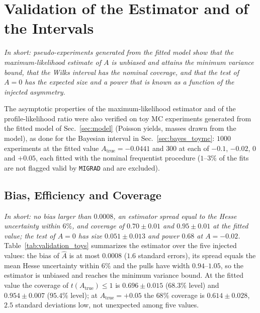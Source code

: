\section{Validation of the Estimator and of the Intervals}
\label{sec:validation}
\emph{In short: pseudo-experiments generated from the fitted model show that the maximum-likelihood estimate of $A$ is unbiased and attains the minimum variance bound, that the Wilks interval has the nominal coverage, and that the test of $A=0$ has the expected size and a power that is known as a function of the injected asymmetry.}

The asymptotic properties of the maximum-likelihood estimator and of the profile-likelihood ratio were also verified on toy MC experiments generated from the fitted model of Sec.~\ref{sec:model} (Poisson yields, masses drawn from the model), as done for the Bayesian interval in Sec.~\ref{sec:bayes_toymc}: $1000$ experiments at the fitted value $A_{\mathrm{true}}=-0.0441$ and $300$ at each of $-0.1$, $-0.02$, $0$ and $+0.05$, each fitted with the nominal frequentist procedure ($1$--$3\%$ of the fits are not flagged valid by \texttt{MIGRAD} and are excluded).

\subsection{Bias, Efficiency and Coverage}
\label{sec:validation_estimator}
\emph{In short: no bias larger than $0.0008$, an estimator spread equal to the Hesse uncertainty within $6\%$, and coverage of $0.70\pm0.01$ and $0.95\pm0.01$ at the fitted value; the test of $A=0$ has size $0.051\pm0.013$ and power $0.68$ at $A=-0.02$.}
Table~\ref{tab:validation_toys} summarizes the estimator over the five injected values: the bias of $\hat A$ is at most $0.0008$ ($1.6$ standard errors), its spread equals the mean Hesse uncertainty within $6\%$ and the pulls have width $0.94$--$1.05$, so the estimator is unbiased and reaches the minimum variance bound. At the fitted value the coverage of $t(A_{\mathrm{true}})\leq1$ is $0.696\pm0.015$ ($68.3\%$ level) and $0.954\pm0.007$ ($95.4\%$ level); at $A_{\mathrm{true}}=+0.05$ the $68\%$ coverage is $0.614\pm0.028$, $2.5$ standard deviations low, not unexpected among five values.

